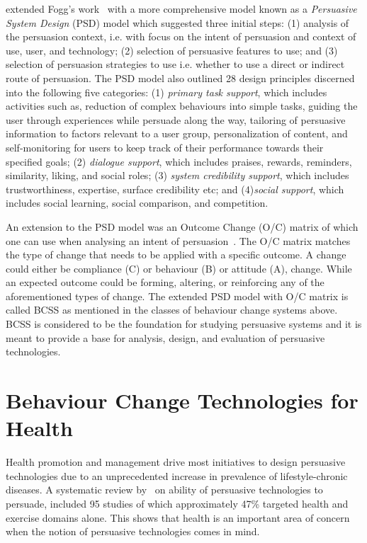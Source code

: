 \cite{Oinas-kukkonen:psd} extended Fogg's work~\citep{fogg2009behavior} with a more comprehensive model known as a \emph{Persuasive System Design} (PSD) model which suggested three initial steps: (1) analysis of the persuasion context, i.e. with focus on the intent of persuasion and context of use, user, and technology; (2) selection of persuasive features to use; and (3) selection of persuasion strategies to use i.e. whether to use a direct or indirect route of persuasion. The PSD model also outlined 28 design principles discerned into the following five categories: (1) \emph{primary task support}, which includes activities such as, reduction of complex behaviours into simple tasks, guiding the user through experiences while persuade along the way, tailoring of persuasive information to factors relevant to a user group, personalization of content, and self-monitoring for users to keep track of their performance towards their specified goals; (2) \emph{dialogue support}, which includes praises, rewards, reminders, similarity, liking, and social roles; (3) \emph{system credibility support}, which includes trustworthiness, expertise, surface credibility etc; and (4)\emph{social support}, which includes social learning, social comparison, and competition.

An extension to the PSD model was an Outcome Change (O/C) matrix of which one can use when analysing an intent of persuasion~\citep{Oinas-Kukkonen:foundation}. The O/C matrix matches the type of change that needs to be applied with a specific outcome. A change could either be compliance (C) or behaviour (B) or attitude (A), change. While an expected outcome could be forming, altering, or reinforcing any of the aforementioned types of change. The extended PSD model with O/C matrix is called BCSS as mentioned in the classes of behaviour change systems above. BCSS is considered to be the foundation for studying persuasive systems and it is meant to provide a base for analysis, design, and evaluation of persuasive technologies. 

\section{Behaviour Change Technologies for Health}
Health promotion and management drive most initiatives to design persuasive technologies due to an unprecedented increase in prevalence of lifestyle-chronic diseases. A systematic review by~\cite{hamari2014persuasive} on ability of persuasive technologies to persuade, included 95 studies of which approximately 47\% targeted health and exercise domains alone. This shows that health is an important area of concern when the notion of persuasive technologies comes in mind.

